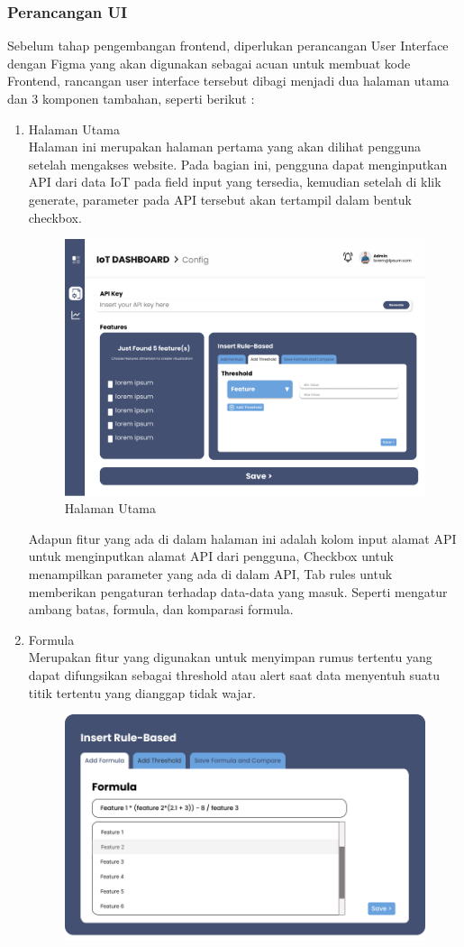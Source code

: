 \subsubsection{Perancangan UI}
Sebelum tahap pengembangan frontend, diperlukan perancangan User Interface dengan Figma yang akan digunakan sebagai acuan untuk membuat kode Frontend, rancangan user interface tersebut dibagi menjadi dua halaman utama dan 3 komponen tambahan, seperti berikut : 
\begin{enumerate}[label={\arabic*.}]
	\item Halaman Utama \\
	Halaman ini merupakan halaman pertama yang akan dilihat pengguna setelah mengakses website. Pada bagian ini, pengguna dapat menginputkan API dari data IoT pada field input yang tersedia, kemudian setelah di klik generate, parameter pada API tersebut akan tertampil dalam bentuk checkbox. 
	\begin{figure}[H]
		\centering
		\includegraphics[width=0.8\linewidth]{gambar/Metodologi/main.png}
		\caption{Halaman Utama}
		\label{Halaman Utama}
	\end{figure}
	Adapun fitur yang ada di dalam halaman ini adalah kolom input alamat API untuk menginputkan alamat API dari pengguna, Checkbox untuk menampilkan parameter yang ada di dalam API, Tab rules untuk memberikan pengaturan terhadap data-data yang masuk. Seperti mengatur ambang batas, formula, dan komparasi formula. 
	\item Formula \\
	Merupakan fitur yang digunakan untuk menyimpan rumus tertentu yang dapat difungsikan sebagai threshold atau alert saat data menyentuh suatu titik tertentu yang dianggap tidak wajar. 
	\begin{figure}[H]
		\centering
		\includegraphics[width=0.8\linewidth]{gambar/Metodologi/formula.png}

\end{figure}
\end{enumerate}
